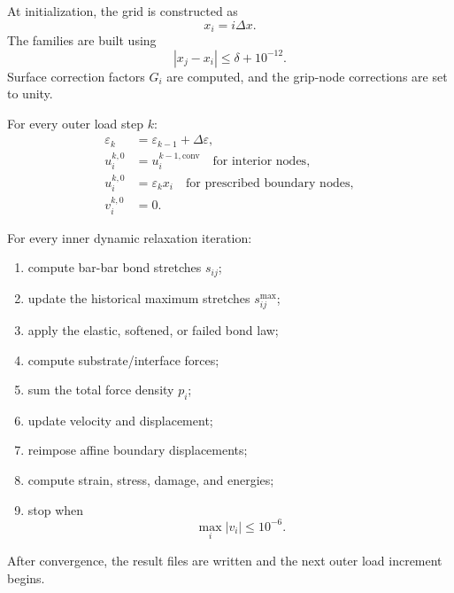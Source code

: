 \documentclass[11pt]{article}
\begin{document}
At initialization, the grid is constructed as
\begin{equation}
x_i=i\Delta x.
\end{equation}
The families are built using
\begin{equation}
|x_j-x_i|\le\delta+10^{-12}.
\end{equation}
Surface correction factors \(G_i\) are computed, and the grip-node corrections are set to unity.

For every outer load step \(k\):
\begin{align}
\varepsilon_k &= \varepsilon_{k-1}+\Delta\varepsilon, \\
u_i^{k,0} &= u_i^{k-1,\mathrm{conv}}
\quad \text{for interior nodes}, \\
u_i^{k,0} &= \varepsilon_k x_i
\quad \text{for prescribed boundary nodes}, \\
v_i^{k,0} &= 0.
\end{align}

For every inner dynamic relaxation iteration:
\begin{enumerate}
\item compute bar-bar bond stretches \(s_{ij}\);
\item update the historical maximum stretches \(s_{ij}^{\max}\);
\item apply the elastic, softened, or failed bond law;
\item compute substrate/interface forces;
\item sum the total force density \(p_i\);
\item update velocity and displacement;
\item reimpose affine boundary displacements;
\item compute strain, stress, damage, and energies;
\item stop when
\begin{equation}
\max_i |v_i| \le 10^{-6}.
\end{equation}
\end{enumerate}

After convergence, the result files are written and the next outer load increment begins.
\end{document}
